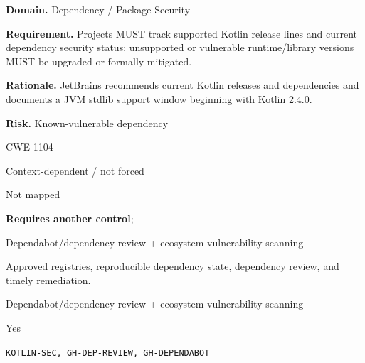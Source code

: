 \documentclass[10pt,letterpaper]{article}
\newcommand{\prioritybadge}[2]{\tcbox[on line,boxrule=0pt,arc=1.2mm,boxsep=0.7mm,left=1mm,right=1mm,top=0.4mm,bottom=0.4mm,colback=#2!12,coltext=#2]{\scriptsize\bfseries #1}}
\begin{document}
\begin{rulebox}[title={\texttt{SCS-KOTLIN-DEP-001} \hfill \prioritybadge{High Priority}{High}}]
\textbf{Domain.} Dependency / Package Security

\textbf{Requirement.} Projects MUST track supported Kotlin release lines and current dependency security status; unsupported or vulnerable runtime/library versions MUST be upgraded or formally mitigated.

\textbf{Rationale.} JetBrains recommends current Kotlin releases and dependencies and documents a JVM stdlib support window beginning with Kotlin 2.4.0.

\textbf{Risk.} Known-vulnerable dependency

\begin{description}[leftmargin=2.65cm,labelwidth=2.3cm,style=nextline,itemsep=1pt,topsep=3pt]
  \item[CWE] CWE-1104
  \item[OWASP] Context-dependent / not forced
  \item[CERT] Not mapped
  \item[CodeQL] \textbf{Requires another control}; ---
  \item[Enforcement] Dependabot/dependency review + ecosystem vulnerability scanning
  \item[Prevention] Approved registries, reproducible dependency state, dependency review, and timely remediation.
  \item[Verification] Dependabot/dependency review + ecosystem vulnerability scanning
  \item[Automation] Yes
  \item[Sources] \texttt{KOTLIN-SEC, GH-DEP-REVIEW, GH-DEPENDABOT}
\end{description}
\end{rulebox}
\end{document}
